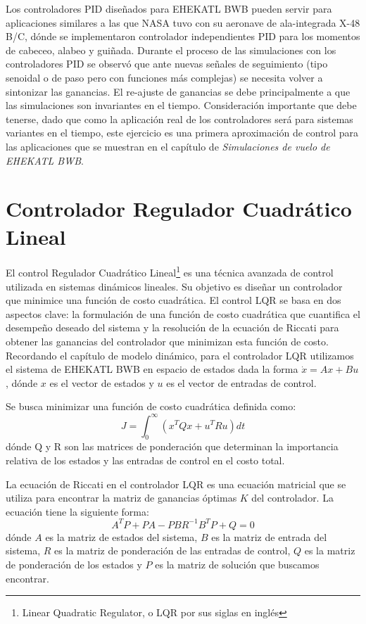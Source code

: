 Los controladores PID diseñados para EHEKATL BWB pueden servir para aplicaciones similares a las que NASA tuvo con su aeronave de ala-integrada X-48 B/C, dónde se implementaron  controlador independientes PID para los momentos de cabeceo, alabeo y guiñada.
%
Durante el proceso de las simulaciones con los controladores PID se observó que ante nuevas señales de seguimiento (tipo senoidal o de paso pero con funciones más complejas) se necesita volver a sintonizar las ganancias. El re-ajuste de ganancias se debe principalmente a que las simulaciones son invariantes en el tiempo. Consideración importante que debe tenerse, dado que como la aplicación real de los controladores será para sistemas variantes en el tiempo, este ejercicio es una primera aproximación de control para las aplicaciones que se muestran en el capítulo de \textit{Simulaciones de vuelo de EHEKATL BWB}.  



\section{Controlador Regulador Cuadrático Lineal}

El control Regulador Cuadrático Lineal\footnote{Linear Quadratic Regulator, o LQR por sus siglas en inglés} es una técnica avanzada de control utilizada en sistemas dinámicos lineales. 
%
Su objetivo es diseñar un controlador que minimice una función de costo cuadrática.
%
El control LQR se basa en dos aspectos clave: la formulación de una función de costo cuadrática que cuantifica el desempeño deseado del sistema y la resolución de la ecuación de Riccati para obtener las ganancias del controlador que minimizan esta función de costo. 
%
Recordando el capítulo de modelo dinámico, para el controlador LQR utilizamos el sistema de EHEKATL BWB en espacio de estados dada la forma $\dot x = Ax + Bu$, dónde $x$ es el vector de estados y $u$ es el vector de entradas de control. 

Se busca minimizar una función de costo cuadrática definida como:
\begin{equation}
    J = \int_0^{\infty} (x^T Qx + u^T Ru) dt
\end{equation}
dónde Q y R son las matrices de ponderación que determinan la importancia relativa de los estados y las entradas de control en el costo total.

La ecuación de Riccati en el controlador LQR es una ecuación matricial que se utiliza para encontrar la matriz de ganancias óptimas $K$ del controlador. La ecuación tiene la siguiente forma:
\begin{equation}
    A^T P + P A - P B R^{-1} B^T P + Q = 0
\end{equation}
dónde $A$ es la matriz de estados del sistema, $B$ es la matriz de entrada del sistema, $R$ es la matriz de ponderación de las entradas de control, $Q$ es la matriz de ponderación de los estados y $P$ es la matriz de solución que buscamos encontrar. 


